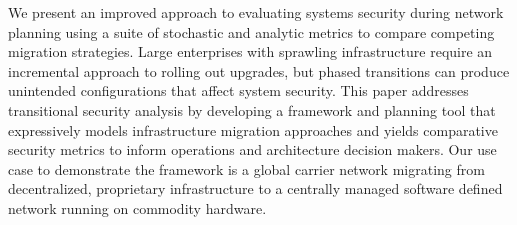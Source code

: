 
We present an improved approach to evaluating systems security during network planning using a suite of stochastic and analytic metrics to compare competing migration strategies. Large enterprises with sprawling infrastructure require an incremental approach to rolling out upgrades, but phased transitions can produce unintended configurations that affect system security. This paper addresses transitional security analysis by developing a framework and planning tool that expressively models infrastructure migration approaches and yields comparative security metrics to inform operations and architecture decision makers. Our use case to demonstrate the framework is a global carrier network migrating from decentralized, proprietary infrastructure to a centrally managed software defined network running on commodity hardware.
